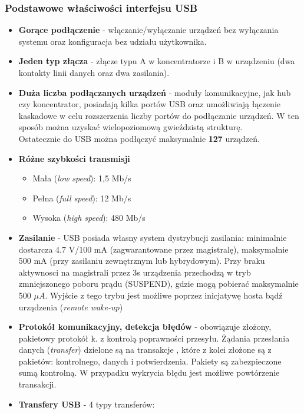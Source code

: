 		\subsubsection{Podstawowe właściwości interfejsu USB}
		\begin{itemize}
			\item \textbf{Gorące podłączenie} - włączanie/wyłączanie urządzeń bez wyłączania systemu oraz konfiguracja bez udziału użytkownika.
			\item \textbf{Jeden typ złącza} - złącze typu A w koncentratorze i B w urządzeniu (dwa kontakty linii danych oraz dwa zasilania).
			\item \textbf{Duża liczba podłączanych urządzeń} - moduły komunikacyjne, jak hub czy koncentrator, posiadają kilka portów USB oraz umożliwiają łączenie kaskadowe w celu rozszerzenia liczby portów do podłączanie urządzeń. W ten sposób można uzyskać wielopoziomową gwieździstą strukturę.\\Ostatecznie do USB można podłączyć maksymalnie \textbf{127} urządzeń.
			\item \textbf{Różne szybkości transmisji}
			\begin{itemize}
				\item Mała (\emph{low speed}): 1,5 Mb/s
				\item Pełna (\emph{full speed}): 12 Mb/s
				\item Wysoka (\emph{high speed}): 480 Mb/s
			\end{itemize}
			\item \textbf{Zasilanie} - USB posiada własny system dystrybucji zasilania: minimalnie dostarcza 4.7 V/100 mA (zagwarantowane przez magistralę), maksymalnie 500 mA (przy zasilaniu zewnętrznym lub hybrydowym). Przy braku aktywnosci na magistrali przez 3s urządzenia przechodzą w tryb zmniejszonego poboru prądu (SUSPEND), gdzie mogą pobierać maksymalnie 500 $\mu A$. Wyjście z tego trybu jest możliwe poprzez inicjatywę hosta bądź urządzenia (\emph{remote wake-up})
			\item \textbf{Protokół komunikacyjny, detekcja błędów} - obowiązuje złożony, pakietowy protokół k. z kontrolą poprawności przesyłu. Żądania przesłania danych (\emph{transfer}) dzielone są na transakcje , które z kolei złożone są z pakietów: kontrolnego, danych i potwierdzenia. Pakiety są zabezpieczone sumą kontrolną. W przypadku wykrycia błędu jest możliwe powtórzenie transakcji.
			\newpage
			\item \textbf{Transfery USB} - 4 typy transferów:
				\begin{itemize}

\end{itemize}
\end{itemize}
